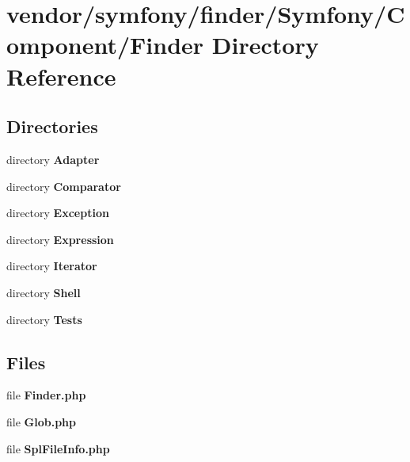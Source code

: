 \section{vendor/symfony/finder/\+Symfony/\+Component/\+Finder Directory Reference}
\label{dir_307cd30824689f06d6bb8e0e6bdb9acc}
\subsection*{Directories}
\begin{DoxyCompactItemize}
\item 
directory {\bf Adapter}
\item 
directory {\bf Comparator}
\item 
directory {\bf Exception}
\item 
directory {\bf Expression}
\item 
directory {\bf Iterator}
\item 
directory {\bf Shell}
\item 
directory {\bf Tests}
\end{DoxyCompactItemize}
\subsection*{Files}
\begin{DoxyCompactItemize}
\item 
file {\bf Finder.\+php}
\item 
file {\bf Glob.\+php}
\item 
file {\bf Spl\+File\+Info.\+php}
\end{DoxyCompactItemize}

